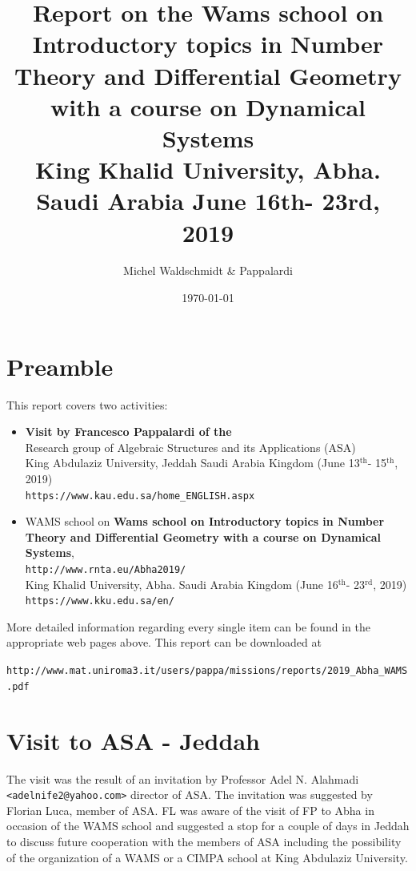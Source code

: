 \documentclass[12pt,a4paper]{scrartcl}
\title{%
Report on the Wams school on\\
Introductory topics in Number Theory and Differential Geometry
with a course on Dynamical Systems\\
King Khalid University, Abha. Saudi Arabia
June 16th- 23rd, 2019 }
\author{Michel Waldschmidt \&  Pappalardi}
\date{\today}
\begin{document}
\maketitle

\section{Preamble}

This report covers two activities:
\begin{itemize}
 \item \textbf{Visit by Francesco Pappalardi of the}\\
Research group of Algebraic Structures and its Applications (ASA)\\
King Abdulaziz University, Jeddah Saudi Arabia Kingdom (June 13$^\text{th}$- 15$^\text{th}$, 2019)\\
\texttt{https://www.kau.edu.sa/home\_ENGLISH.aspx}
 \item WAMS school on
\textbf{Wams school on
Introductory topics in Number Theory and Differential Geometry
with a course on Dynamical Systems},\\
\texttt{http://www.rnta.eu/Abha2019/}\\
King Khalid University, Abha. Saudi Arabia Kingdom (June 16$^\text{th}$- 23$^\text{rd}$, 2019)\\
\texttt{https://www.kku.edu.sa/en/}
\end{itemize}

More detailed information regarding every single item can be found in the appropriate web pages above. This report can be downloaded at

\texttt{http://www.mat.uniroma3.it/users/pappa/missions/reports/2019\_Abha\_WAMS.pdf}

\section{Visit to ASA - Jeddah}

The visit was the result of an invitation by Professor Adel N. Alahmadi \texttt{<adelnife2@yahoo.com>} director
of ASA. The invitation was suggested by Florian Luca, member of ASA. FL was aware of the visit of FP to Abha in occasion of the WAMS school and suggested a stop for a couple of days in Jeddah to discuss future cooperation with the members of ASA including the possibility of the organization of a WAMS or a CIMPA school at King Abdulaziz University. 
\end{document}
